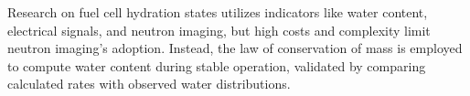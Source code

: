 Research on fuel cell hydration states utilizes indicators like water content, electrical signals, and neutron imaging\cite{hussainiVisualizationQuantificationCathode2009, leeVisualizationFloodingSingle2012}, but high costs and complexity limit neutron imaging's adoption. Instead, the law of conservation of mass is employed to compute water content during stable operation, validated by comparing calculated rates with observed water distributions\cite{pekulaStudyWaterDistribution2005,traboldSituInvestigationWater2006,yangVisualizationLiquidWater2004}.



